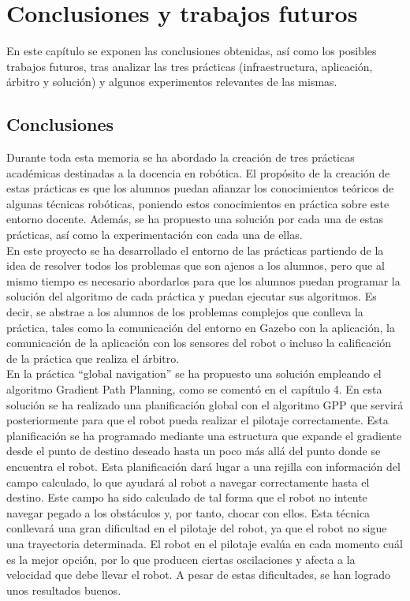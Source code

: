 \chapter{Conclusiones y trabajos futuros}\label{cap.conclusiones}
En este capítulo se exponen las conclusiones obtenidas, así como los posibles trabajos futuros, tras analizar las tres prácticas (infraestructura, aplicación, árbitro y solución) y algunos experimentos relevantes de las mismas.\\

\section{Conclusiones}
Durante toda esta memoria se ha abordado la creación de tres prácticas académicas destinadas a la docencia en robótica. El propósito de la creación de estas prácticas es que los alumnos puedan afianzar los conocimientos teóricos de algunas técnicas robóticas, poniendo estos conocimientos en práctica sobre este entorno docente. Además, se ha propuesto una solución por cada una de estas prácticas, así como la experimentación con cada una de ellas.\\

En este proyecto se ha desarrollado el entorno de las prácticas partiendo de la idea de resolver todos los problemas que son ajenos a los alumnos, pero que al mismo tiempo es necesario abordarlos para que los alumnos puedan programar la solución del algoritmo de cada práctica y puedan ejecutar sus algoritmos. Es decir, se abstrae a los alumnos de los problemas complejos que conlleva la práctica, tales como la comunicación del entorno en Gazebo con la aplicación, la comunicación de la aplicación con los sensores del robot o incluso la calificación de la práctica que realiza el árbitro.\\

En la práctica ``global navigation'' se ha propuesto una solución empleando el algoritmo Gradient Path Planning, como se comentó en el capítulo 4. En esta solución se ha realizado una planificación global con el algoritmo GPP que servirá posteriormente para que el robot pueda realizar el pilotaje correctamente. Esta planificación se ha programado mediante una estructura que expande el gradiente desde el punto de destino deseado hasta un poco más allá del punto donde se encuentra el robot. Esta planificación dará lugar a una rejilla con información del campo calculado, lo que ayudará al robot a navegar correctamente hasta el destino. Este campo ha sido calculado de tal forma que el robot no intente navegar pegado a los obstáculos y, por tanto, chocar con ellos. Esta técnica conllevará una gran dificultad en el pilotaje del robot, ya que el robot no sigue una trayectoria determinada. El robot en el pilotaje evalúa en cada momento cuál es la mejor opción, por lo que producen ciertas oscilaciones y afecta a la velocidad que debe llevar el robot. A pesar de estas dificultades, se han logrado unos resultados buenos. \\

